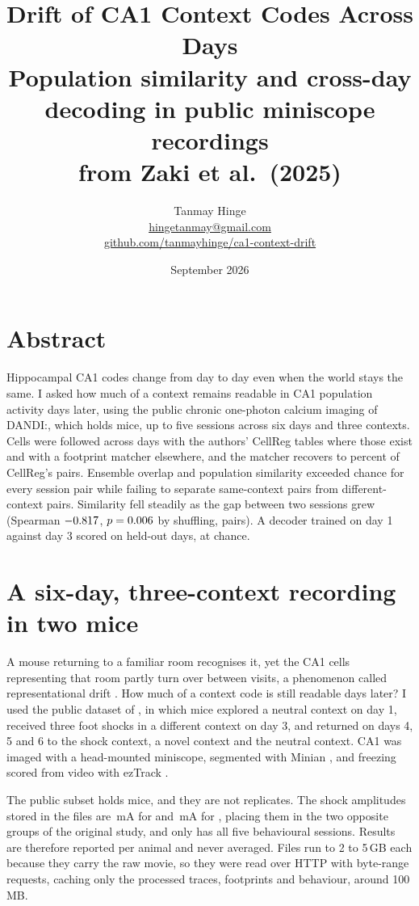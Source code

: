 \documentclass[11pt,a4paper]{article}
\title{\vspace{-1.5cm}\textbf{Drift of CA1 Context Codes Across Days}\\[0.3em]
\large Population similarity and cross-day decoding in public miniscope recordings\\
from Zaki et al.\ (2025)}
\author{Tanmay Hinge \\ \href{mailto:hingetanmay@gmail.com}{hingetanmay@gmail.com} \\
\href{https://github.com/tanmayhinge/ca1-context-drift}{github.com/tanmayhinge/ca1-context-drift}}
\date{September 2026}
\begin{document}
\maketitle
\vspace{-1em}

\section*{Abstract}

Hippocampal CA1 codes change from day to day even when the world stays the same. I asked how
much of a context remains readable in CA1 population activity days later, using the public
chronic one-photon calcium imaging of DANDI:\numDatasetDandiset{}, which holds
\numDatasetMice{} mice, up to five sessions across six days and three contexts. Cells were
followed across days with the authors' CellReg tables where those exist and with a footprint
matcher elsewhere, and the matcher recovers \numMatchingRecallMinPercent{} to
\numMatchingRecallMaxPercent{} percent of CellReg's pairs. Ensemble overlap and population
similarity exceeded chance for every session pair while failing to separate same-context pairs
from different-context pairs. Similarity fell steadily as the gap between two sessions grew
(Spearman $-0.817{}$, $p=0.006{}$ by shuffling,
\numSimilarityDriftPairs{} pairs). A decoder trained on day 1 against day 3 scored
\numDecodingPooledHeldOutWeak{} on held-out days, at chance.

\section{A six-day, three-context recording in two mice}

A mouse returning to a familiar room recognises it, yet the CA1 cells representing that room
partly turn over between visits, a phenomenon called representational drift
\citep{ziv2013,rule2019}. How much of a context code is still readable days later? I used the
public dataset of \citet{zaki2025}, in which mice explored a neutral context on day 1, received
three foot shocks in a different context on day 3, and returned on days 4, 5 and 6 to the shock
context, a novel context and the neutral context. CA1 was imaged with a head-mounted miniscope,
segmented with Minian \citep{dong2022}, and freezing scored from video with ezTrack
\citep{pennington2019}.

The public subset holds \numDatasetMice{} mice, and they are not replicates. The shock
amplitudes stored in the files are \numDatasetShockMaStrong{}\,mA for
\numDatasetStrongShockMouse{} and \numDatasetShockMaWeak{}\,mA for
\numDatasetWeakShockMouse{}, placing them in the two opposite groups of the original study, and
only \numDatasetWeakShockMouse{} has all five behavioural sessions. Results are therefore
reported per animal and never averaged. Files run to 2 to 5\,GB each because they carry the raw
movie, so they were read over HTTP with byte-range requests, caching only the processed traces,
footprints and behaviour, around 100\,MB.
\end{document}
